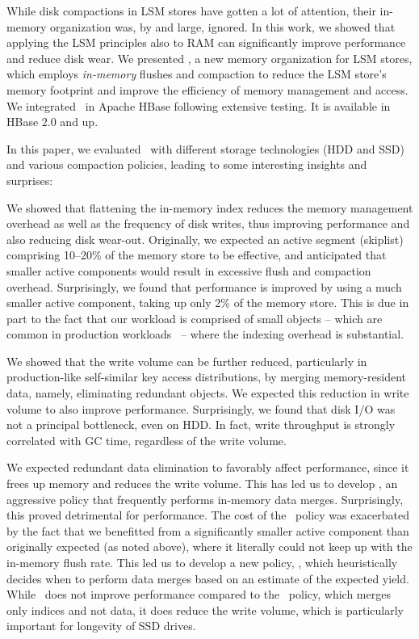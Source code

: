 
While disk compactions in LSM stores have gotten a lot of attention, their in-memory organization was, by and large,  ignored.
In this work, we showed that applying the LSM  principles also to RAM can significantly improve performance and reduce disk wear. 
We presented \sys, a new memory organization for LSM stores, which employs \emph{in-memory} flushes and 
compaction to reduce the LSM store's memory footprint and improve the efficiency of memory management and access. 
We integrated \sys\ in Apache HBase following extensive testing. It is available in HBase 2.0 and up.

In this paper, we evaluated \sys\ with different storage technologies (HDD and SSD) and various compaction policies, leading
to some interesting insights and surprises:

We showed that flattening the in-memory index reduces the memory management overhead as well as the frequency of
disk writes, thus  improving performance and also reducing disk wear-out. Originally, we expected  an active segment
(skiplist) comprising 10--20\% of the memory store to be effective, and anticipated that smaller active components would 
result in excessive flush and compaction overhead. Surprisingly, we found that performance is improved by using a much 
smaller active component, taking up only 2\% of the memory store. This is due in part to the fact that our workload is comprised
of small objects -- which are common in production workloads~\cite{Wu2015} -- where the indexing overhead is substantial.   

We showed that the write volume can be further reduced, particularly in production-like self-similar key access distributions, by merging memory-resident data, namely, eliminating redundant objects.
We expected this reduction in write volume to also improve performance. Surprisingly, we found that 
disk I/O was not a principal bottleneck, even on HDD. In fact, write throughput is strongly correlated with GC time, 
regardless of the write volume.

We expected redundant data elimination to favorably affect performance, since it frees up memory and reduces the write volume.
This has led us to develop \eager, an aggressive policy that frequently performs in-memory data merges. 
Surprisingly, this proved detrimental for performance. The cost of the \eager\ policy was exacerbated by the 
fact that we benefitted from a significantly smaller active component than originally expected (as noted above),  
where it literally could not keep up with the in-memory flush rate. 
This led us to develop a new policy, \adp, which heuristically decides when to perform data merges based on 
an estimate of the expected yield. 
While \adp\ does not improve performance compared to the  \basic\ policy, which merges only indices and not data,
it does reduce the write volume, which is particularly important for longevity of SSD drives.

